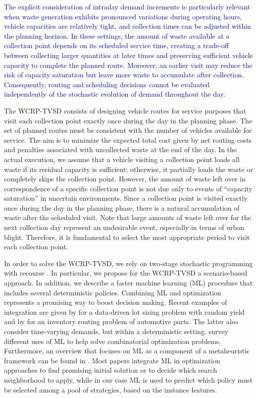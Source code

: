 \documentclass[authoryear,preprint,12pt]{elsarticle}
\newcommand{\rev}[1]{\textcolor{blue}{{#1}}}
\begin{document}
\rev{The explicit consideration of intraday demand increments is particularly relevant when waste generation exhibits pronounced variations during operating hours, vehicle capacities are relatively tight, and collection times can be adjusted within the planning horizon. In these settings, the amount of waste available at a collection point depends on its scheduled service time, creating a trade-off between collecting larger quantities at later times and preserving sufficient vehicle capacity to complete the planned route. Moreover, an earlier visit may reduce the risk of capacity saturation but leave more waste to accumulate after collection. Consequently, routing and scheduling decisions cannot be evaluated independently of the stochastic evolution of demand throughout the day.}
 
The WCRP-TVSD consists of designing vehicle routes for service purposes that visit each collection point exactly once during the day in the planning phase. The set of planned routes must be consistent with the number of vehicles available for service. The aim is to minimize the expected total cost given by net routing costs and penalties associated with uncollected waste at the end of the day.
%
In the actual execution, we assume that a vehicle visiting a collection point loads all waste if its residual capacity is sufficient; otherwise, it partially loads the waste or completely skips the collection point. However, the amount of waste left over in correspondence of a specific collection point is not due only to events of ``capacity saturation'' in uncertain environments. Since a collection point is visited exactly once during the day in the planning phase, there is a natural accumulation of waste after the scheduled visit.
Note that large amounts of waste left over for the next collection day represent an undesirable event, especially in terms of urban blight. Therefore, it is fundamental to select the most appropriate period to visit each collection point.  

In order to solve the WCRP-TVSD, we rely on two-stage stochastic
programming with recourse \citep{Ruszczynski2003}. In particular, we propose for the WCRP-TVSD a scenario-based approach. In addition, we describe a faster machine learning (ML) procedure that includes several deterministic policies. Combining ML and optimization represents a promising way to boost decision making. Recent examples of integration are given by \cite{Bibak2025} for a data-driven lot sizing problem with random yield and by \cite{Wang2025} for an inventory routing problem of automotive parts. The latter also consider time-varying demands, but within a deterministic setting.  
\cite{Bengio2021} survey different uses of ML  to help solve combinatorial optimization problems.
Furthermore, an overview that focuses on ML as a component of a metaheuristic framework can be found in \cite{Karimi2022}. Most papers integrate ML in optimization approaches to find promising initial solution or to decide which search neighborhood to apply, while in our case ML is used to predict which policy must be selected among a pool of strategies, based on the instance features.
\end{document}
